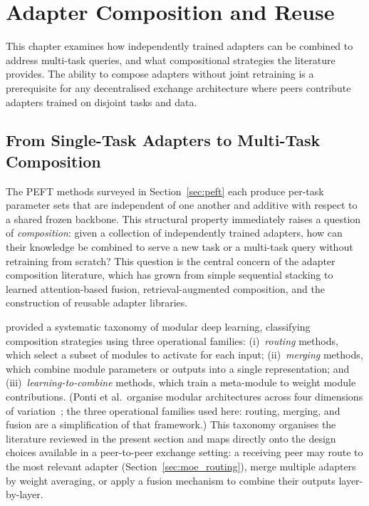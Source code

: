 \section{Adapter Composition and Reuse}
\label{sec:adapter_composition}

This chapter examines how independently trained adapters can be combined
to address multi-task queries, and what compositional strategies the
literature provides. The ability to compose adapters without joint
retraining is a prerequisite for any decentralised exchange architecture
where peers contribute adapters trained on disjoint tasks and data.

\subsection{From Single-Task Adapters to Multi-Task Composition}
\label{sec:adapter_composition:intro}

The PEFT methods surveyed in Section~\ref{sec:peft} each produce per-task parameter
sets that are independent of one another and additive with respect to a shared frozen
backbone. This structural property immediately raises a question of \textit{composition}:
given a collection of independently trained adapters, how can their knowledge be combined
to serve a new task or a multi-task query without retraining from scratch? This question
is the central concern of the adapter composition literature, which has grown from simple
sequential stacking to learned attention-based fusion, retrieval-augmented composition,
and the construction of reusable adapter libraries.

\citet{Ponti2023} provided a systematic taxonomy of modular deep learning, classifying
composition strategies using three operational families: (i)~\textit{routing} methods, which select
a subset of modules to activate for each input; (ii)~\textit{merging} methods, which
combine module parameters or outputs into a single representation; and
(iii)~\textit{learning-to-combine} methods, which train a meta-module to weight module
contributions. (Ponti et al.\ organise modular architectures across four dimensions of
variation~\citep{Ponti2023}; the three operational families used here: routing, merging,
and fusion are a simplification of that framework.) This taxonomy organises the literature
reviewed in the present section and maps directly onto the design choices available in a
peer-to-peer exchange setting: a receiving peer may route to the most relevant adapter
(Section~\ref{sec:moe_routing}), merge multiple adapters by weight averaging, or apply a
fusion mechanism to combine their outputs layer-by-layer.


